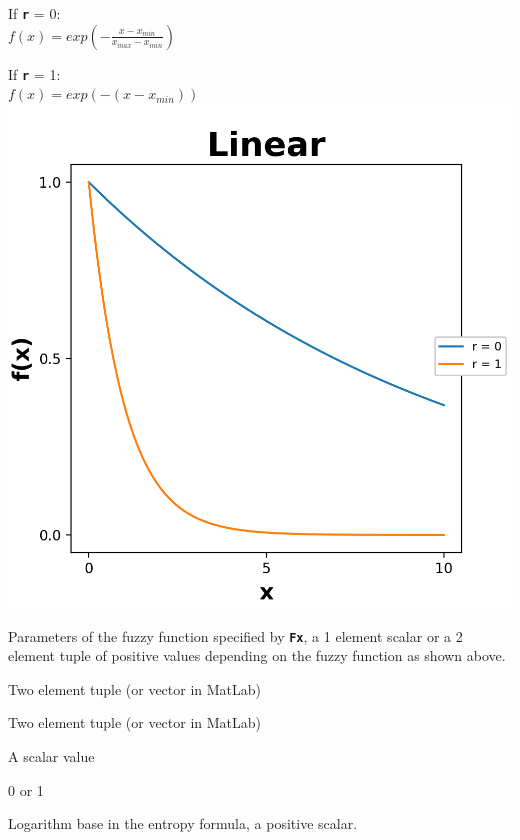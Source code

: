 \documentclass[12pt, a4paper, titlepage, openany]{book}
\begin{document}
\begin{description}[labelsep=1cm, labelwidth=2cm, nosep,style=multiline,leftmargin=3cm]
\begin{description}[labelsep=14em, labelwidth=10em, nosep,style=multiline,leftmargin=6cm]
	\item[\texttt{"linear"}]	If \texttt{\textbf{r}} = 0: \\
	$f(x) = exp(-\frac{x - x_{min}}{x_{max} - x_{min}}) $
	\item[]			If \texttt{\textbf{r}} = 1: \\ $f(x) = exp(-(x - x_{min}))$\\
		\includegraphics[scale=.5]{Fuzz4.png}
	\end{description}
	
\item[\texttt{r}]	Parameters of the fuzzy function specified by \textbf{\texttt{Fx}}, a 1 element scalar or a 2 element tuple of positive values depending on the fuzzy function as shown above.
	\begin{description}[labelsep=14em, labelwidth=10em, nosep,style=multiline,leftmargin=3cm]
	\item[\texttt{\emph{Default}}]		Two element tuple (or vector in MatLab)
	\item[\texttt{\emph{Sigmoid/ModSampEn}}]		Two element tuple (or vector in MatLab)
	\item[\texttt{\emph{Gudermannian}}] A scalar value
	\item[\texttt{\emph{Linear}}]		0 or 1
	\end{description}

\item[\texttt{Logx}]	Logarithm base in the entropy formula, a positive scalar.
\end{description}
\end{document}
